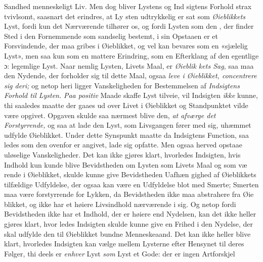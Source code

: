 Sandhed menneskeligt Liv. Men dog bliver Lystens og Ind\-%
sigtens Forhold strax tvivlsomt, saasnart det erindres, at Ly\-%
sten udtrykkelig er sat som \emph{Øieblikkets} Lyst, fordi kun det
Nærværende tilhører os, og fordi Lysten som den ,
der finder Sted i den Fornemmende som sandselig bestemt, i
sin Opstaaen er et Forsvindende, der maa gribes i Øieblikket,
og vel kan bevares som en «sjælelig Lyst», men saa kun som
en mattere Erindring, som en Efterklang af den egentlige ɔ:
legemlige Lyst. Naar nemlig Lysten, Livets Maal, er \emph{Øieblik\-%
kets Sag,} saa maa den Nydende, der forholder sig til dette
Maal, ogsaa \emph{leve i Øieblikket, concentrere sig deri;}
og netop heri ligger Vanskeligheden for Bestemmelsen af
\emph{Indsigtens Forhold til Lysten.} \emph{Paa positiv} Maade
skaffe Lyst tilveie, vil Indsigten \emph{ikke} kunne, thi saaledes
maatte der gaaes ud over Livet i Øieblikket og Standpunktet
vilde være opgivet. Opgaven skulde saa nærmest blive den,
\emph{at afværge det Forstyrrende,} og saa at lade den Lyst,
som Livsgangen fører med sig, uhæmmet udfylde Øieblikket.
Under dette Synspunkt maatte da Indsigtens Function, saa\-%
ledes som den ovenfor er angivet, lade sig opfatte. Men
ogsaa herved opstaae uløselige Vanskeligheder. Det kan ikke
gjøres klart, hvorledes Indsigten, hvis Indhold kun kunde
blive Bevidstheden om Lysten som Livets Maal og som væ\-%
rende i Øieblikket, skulde kunne give Bevidstheden Uafhæn\-%
gighed af Øieblikkets tilfældige Udfyldelse, der ogsaa kan være
en Udfyldelse blot med Smerte; Smerten maa være forstyrrende
for Lykken, da Bevidstheden ikke maa abstrahere fra Øie\-%
blikket, og ikke har et høiere Livsindhold nærværende i sig.
Og netop fordi Bevidstheden ikke har et Indhold, der er
høiere end Nydelsen, kan det ikke heller gjøres klart, hvor\-%
ledes Indsigten skulde kunne give en Frihed i den Nydelse,
der skal udfylde den til Øieblikket bundne Menneskeaand.
Det kan ikke heller blive klart, hvorledes Indsigten kan vælge
mellem Lysterne efter Hensynet til deres Følger, thi deels er
\emph{enhver} Lyst \emph{som} Lyst et Gode: der er ingen Artforskjel
